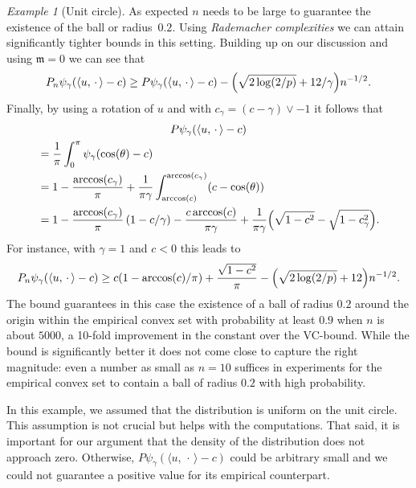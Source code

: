 \documentclass[AHL,Unicode,longabstracts,published]{cedram}
\theoremstyle{remark}
\newtheorem{examl}{Example}
\newcommand{\mean}{\mathfrak{m}}
\let\originalleft\left
\let\originalright\right
\renewcommand{\left}{\mathopen{}\mathclose\bgroup\originalleft}
\renewcommand{\right}{\aftergroup\egroup\originalright}
\begin{document}
\begin{examl}[{Unit circle}]
As expected $n$ needs to be large to guarantee the existence of the ball or radius~$0.2$. Using \emph{Rademacher complexities} we can attain significantly tighter bounds in this setting. Building up on our discussion and using $\mean=0$ we can see that
\[
P_n \psi_\gamma(\langle u, \,\cdot\, \rangle -c) \geq P \psi_\gamma(\langle u, \,\cdot\, \rangle -c) - \left(
\sqrt{2\log(2/p)} + 12/\gamma\right) n^{-1/2}.
\]
Finally, by using a rotation of $u$ and with $c_\gamma = (c- \gamma) \vee -1$ it follows that
\begin{multline*}
P \psi_\gamma(\langle u, \,\cdot\, \rangle -c)\\
\begin{aligned}
&= \frac{1}{\pi} \int_0^\pi \psi_\gamma(\cos(\theta) - c)
\\
&= 1- \frac{\arccos(c_\gamma)}{\pi} + \frac{1}{\pi\gamma} \int_{\arccos(c)}^{\arccos(c_\gamma)} (c-\cos(\theta)) \\
&= 1 - \frac{\arccos(c_\gamma)}{\pi} \, (1- c/\gamma) -
\frac{c \arccos(c)}{\pi \gamma} +\frac{1}{\pi\gamma} \left(\sqrt{1-c^2} - \sqrt{1-c_\gamma^2}\right).
\end{aligned}
\end{multline*}
For instance, with $\gamma=1$ and $c<0$ this leads to
\begin{align*}
P_n \psi_\gamma(\langle u, \,\cdot\, \rangle -c) \geq c (1- \arccos(c)/\pi) + \frac{\sqrt{1-c^2}}{\pi} - \left(\sqrt{2\log(2/p)} + 12\right) n^{-1/2}.
\end{align*}
The bound guarantees in this case the existence of a ball of radius $0.2$ around the origin within the empirical convex set with probability at least $0.9$ when $n$ is about $5000$, a 10-fold improvement in the constant over the VC-bound. While the bound is significantly better it does not come close to capture the right magnitude: even a number as small as $n=10$ suffices in experiments for the empirical convex set to contain a ball of radius $0.2$ with high probability.

In this example, we assumed that the distribution is uniform on the unit circle. This assumption is not crucial but helps with the computations. That said, it is important for our argument that the density of the distribution does not approach zero. Otherwise, $P\psi_\gamma(\langle u, \,\cdot\, \rangle -c)$ could be arbitrary small and we could not guarantee a positive value for its empirical counterpart.
\end{examl}


\end{document}
